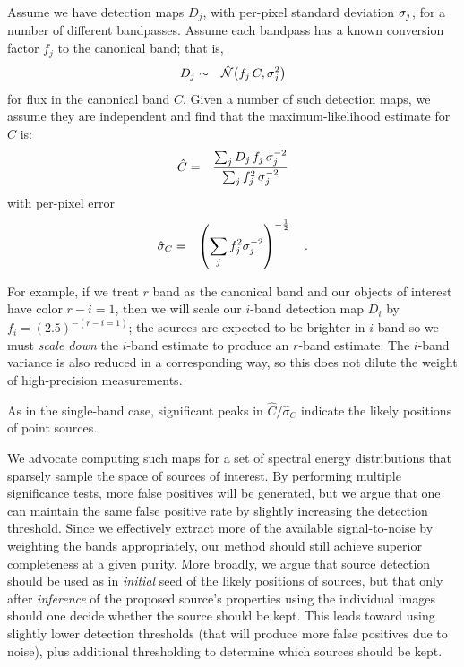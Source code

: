 \documentclass[letterpaper,preprint]{aastex}
\newcommand{\drawnfrom}{\sim}
\newcommand{\gaussianN}{\mathcal{N}}
\newcommand{\gaussx}[1]{\hat{\gaussianN}\!\left(#1\right)}
\begin{document}
Assume we have detection maps $D_j$, with per-pixel standard deviation
$\sigma_{j}$, for a number of different bandpasses.  Assume each
bandpass has a known conversion factor $f_j$ to the canonical band;
that is,
\begin{eqnarray}
  D_j & \drawnfrom & \gaussx{f_j \, C, \sigdj^2}
\end{eqnarray}
for flux in the canonical band $C$.  Given a number of such detection
maps, we assume they are independent and find that the
maximum-likelihood estimate for $C$ is:
\begin{eqnarray}
  \hat{C} &=& 
  \frac{\sum_j D_j \, f_j \, \sigdj^{-2}}%
       {\sum_j f_j^2 \, \sigdj^{-2}}
\end{eqnarray}
with per-pixel error
\begin{eqnarray}
  \hat{\sigma}_C &=& \left( \sum_j f_j^2 \sigma_{j}^{-2} \right)^{-\frac{1}{2}}
  \quad .
\end{eqnarray}


For example, if we treat $r$ band as the canonical band and our
objects of interest have color $r-i = 1$, then we will scale our
$i$-band detection map $D_i$ by $f_i = (2.5)^{-(r-i = 1)}$; the
sources are expected to be brighter in $i$ band so we must \emph{scale
  down} the $i$-band estimate to produce an $r$-band estimate.  The
$i$-band variance is also reduced in a corresponding way, so this does
not dilute the weight of high-precision measurements.


As in the single-band case, significant peaks in $\hat{C} /
\hat{\sigma}_C$ indicate the likely positions of point sources.

We advocate computing such maps for a set of spectral energy
distributions that sparsely sample the space of sources of interest.
By performing multiple significance tests, more false positives will
be generated, but we argue that one can maintain the same false
positive rate by slightly increasing the detection threshold.  Since
we effectively extract more of the available signal-to-noise by
weighting the bands appropriately, our method should still achieve
superior completeness at a given purity.
%
More broadly, we argue that source detection should be used as in
\emph{initial} seed of the likely positions of sources, but that only
after \emph{inference} of the proposed source's properties using the
individual images should one decide whether the source should be kept.
This leads toward using slightly lower detection thresholds (that will
produce more false positives due to noise), plus additional
thresholding to determine which sources should be kept.
\end{document}
